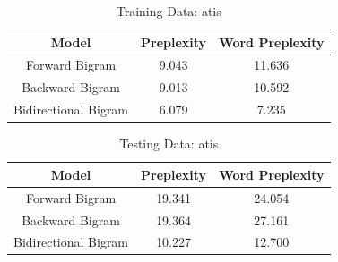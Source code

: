 \documentclass[journal, a4paper]{IEEEtran}
\begin{document}
	\begin{table}[!hbt]
		\begin{center}
		\caption{Training Data: atis}
		\label{tab:1}
		\begin{tabular}{|c|c|c|}
			\hline
			Model & Preplexity & Word Preplexity\\
			\hline
			 Forward Bigram & 9.043  & 11.636 \\ \hline
			 Backward Bigram & 9.013 &  10.592 \\ \hline
			Bidirectional Bigram & 6.079 & 7.235 \\
			\hline
		\end{tabular}
		\end{center}
	\end{table}
\vspace{-7mm}	
	\begin{table}[!hbt]
		\begin{center}
		\caption{Testing Data: atis}
		\label{tab:2}
		\begin{tabular}{|c|c|c|}
			\hline
			Model & Preplexity & Word Preplexity\\
			\hline
			 Forward Bigram &19.341  & 24.054 \\ \hline
			 Backward Bigram & 19.364 &  27.161 \\ \hline
			Bidirectional Bigram & 10.227 & 12.700 \\
			\hline
		\end{tabular}
		\end{center}
	\end{table}
	
\end{document}
